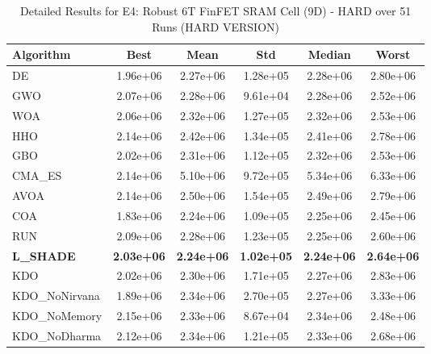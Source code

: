 \begin{table}[htbp]
\centering
\caption{Detailed Results for E4: Robust 6T FinFET SRAM Cell (9D) - HARD over 51 Runs (HARD VERSION)}
\label{tab:P4_detailed}
\small
\begin{tabular}{lccccc}
\toprule
\textbf{Algorithm} & \textbf{Best} & \textbf{Mean} & \textbf{Std} & \textbf{Median} & \textbf{Worst} \\
\midrule
DE & 1.96e+06 & 2.27e+06 & 1.28e+05 & 2.28e+06 & 2.80e+06 \\
GWO & 2.07e+06 & 2.28e+06 & 9.61e+04 & 2.28e+06 & 2.52e+06 \\
WOA & 2.06e+06 & 2.32e+06 & 1.27e+05 & 2.32e+06 & 2.53e+06 \\
HHO & 2.14e+06 & 2.42e+06 & 1.34e+05 & 2.41e+06 & 2.78e+06 \\
GBO & 2.02e+06 & 2.31e+06 & 1.12e+05 & 2.32e+06 & 2.53e+06 \\
CMA_ES & 2.14e+06 & 5.10e+06 & 9.72e+05 & 5.34e+06 & 6.33e+06 \\
AVOA & 2.14e+06 & 2.50e+06 & 1.54e+05 & 2.49e+06 & 2.79e+06 \\
COA & 1.83e+06 & 2.24e+06 & 1.09e+05 & 2.25e+06 & 2.45e+06 \\
RUN & 2.09e+06 & 2.28e+06 & 1.23e+05 & 2.25e+06 & 2.60e+06 \\
\textbf{L_SHADE} & \textbf{2.03e+06} & \textbf{2.24e+06} & \textbf{1.02e+05} & \textbf{2.24e+06} & \textbf{2.64e+06} \\
KDO & 2.02e+06 & 2.30e+06 & 1.71e+05 & 2.27e+06 & 2.83e+06 \\
KDO_NoNirvana & 1.89e+06 & 2.34e+06 & 2.70e+05 & 2.27e+06 & 3.33e+06 \\
KDO_NoMemory & 2.15e+06 & 2.33e+06 & 8.67e+04 & 2.34e+06 & 2.48e+06 \\
KDO_NoDharma & 2.12e+06 & 2.34e+06 & 1.21e+05 & 2.33e+06 & 2.68e+06 \\
\bottomrule
\end{tabular}
\end{table}
